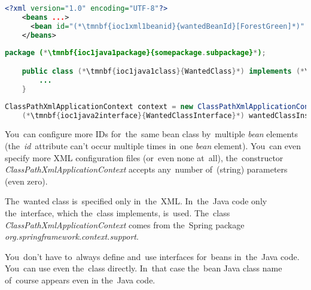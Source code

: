 \begin{lstlisting}[language=XML, title={Configuration XML}]
    <?xml version="1.0" encoding="UTF-8"?>
    <beans ...>
      <bean id="(*\tmnbf{ioc1xml1beanid}{wantedBeanId}[ForestGreen]*)" class="(*\tmnbf{ioc1xml1package}{somepackage.subpackage}[ForestGreen]*).(*\tmnbf{ioc1xml1class}{WantedClass}[ForestGreen]*)"/>
    </beans>
\end{lstlisting}
\begin{lstlisting}[language=Java, title={Wanted class}]
    package (*\tmnbf{ioc1java1package}{somepackage.subpackage}*);

    public class (*\tmnbf{ioc1java1class}{WantedClass}*) implements (*\tmnbf{ioc1java1interface}{WantedClassInterface}*) {
        ...
    }
\end{lstlisting}
\begin{lstlisting}[language=Java, title={Usage}]
    ClassPathXmlApplicationContext context = new ClassPathXmlApplicationContext("configurationFile.xml");
    (*\tmnbf{ioc1java2interface}{WantedClassInterface}*) wantedClassInstance = context.getBean("(*\tmnbf{ioc1java2beanid}{wantedBeanId}[ForestGreen]*)", (*\tmnbf{ioc1java2interface2}{WantedClassInterface}*).class);
\end{lstlisting}

\noindent You~can configure more IDs for~the~same bean class by~multiple \textit{bean} elements (the~\textit{id}~attribute can't occur multiple times in~one \textit{bean} element).
You~can even specify more XML configuration files (or~even none at~all), the~constructor \mbox{\textit{ClassPathXmlApplicationContext}} accepts any~number of~(string) parameters (even zero).

The~wanted class is~specified only in~the~XML.
In~the~Java code only the~interface, which the~class implements, is~used.
The~class \textit{ClassPathXmlApplicationContext} comes from the~Spring package \textit{org.springframework.context.support}.

\note You~don't have to~always define and~use interfaces for~beans in~the~Java code.
You~can use even the~class directly.
In~that case the~bean Java class name of~course appears even in the~Java code.
\newpage

